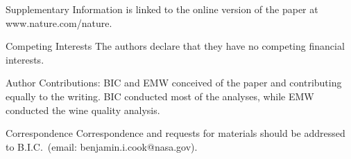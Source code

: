 \documentclass[final]{nature}
\begin{document}





\begin{addendum}
 \item [Supplementary Information] is linked to the online version of the paper at www.nature.com/nature.
 \item[Competing Interests] The authors declare that they have no
competing financial interests.
\item [Author Contributions:] BIC and EMW conceived of the paper and contributing equally to the writing. BIC conducted most of the analyses, while EMW conducted the wine quality analysis.
 \item[Correspondence] Correspondence and requests for materials
should be addressed to B.I.C.~(email: benjamin.i.cook@nasa.gov).
\end{addendum}
\end{document}
